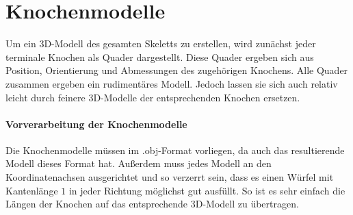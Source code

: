 \section{Knochenmodelle}
\label{bone_models}

Um ein 3D-Modell des gesamten Skeletts zu erstellen, wird zunächst jeder terminale Knochen als Quader dargestellt. Diese Quader ergeben sich aus Position, Orientierung und Abmessungen des zugehörigen Knochens. Alle Quader zusammen ergeben ein rudimentäres Modell. Jedoch lassen sie sich auch relativ leicht durch feinere 3D-Modelle der entsprechenden Knochen ersetzen. 

\paragraph{Vorverarbeitung der Knochenmodelle}

Die Knochenmodelle müssen im .obj-Format vorliegen, da auch das resultierende Modell dieses Format hat. Außerdem muss jedes Modell an den Koordinatenachsen ausgerichtet und so verzerrt sein, dass es einen Würfel mit Kantenlänge $1$ in jeder Richtung möglichst gut ausfüllt. So ist es sehr einfach die Längen der Knochen auf das entsprechende 3D-Modell zu übertragen.

